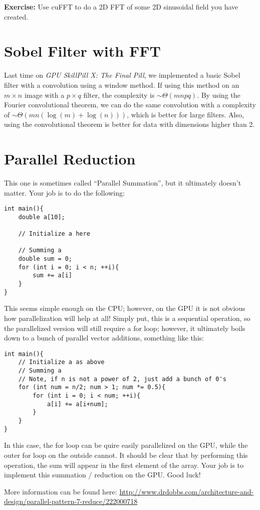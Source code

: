 \documentclass[11pt]{article}
\begin{document}
\textbf{Exercise:} Use cuFFT to do a 2D FFT of some 2D sinusoidal field you have created.

\newpage

\section*{Sobel Filter with FFT}

Last time on \textit{GPU SkillPill X: The Final Pill}, we implemented a basic Sobel filter with a convolution using a window method. If using this method on an $m \times n$ image with a $p \times q$ filter, the complexity is $\sim \Theta(mnpq)$. By using the Fourier convolutional theorem, we can do the same convolution with a complexity of $\sim \Theta(mn(\log (m) + \log (n)))$, which is better for large filters. Also, using the convolutional theorem is better for data with dimensions higher than 2.

\newpage

\section*{Parallel Reduction}

This one is sometimes called ``Parallel Summation'', but it ultimately doesn't matter. Your job is to do the following:

\begin{lstlisting}
int main(){
    double a[10];
    
    // Initialize a here
    
    // Summing a
    double sum = 0;
    for (int i = 0; i < n; ++i){
        sum += a[i]
    }
}
\end{lstlisting}

This seems simple enough on the CPU; however, on the GPU it is not obvious how parallelization will help at all! Simply put, this is a sequential operation, so the parallelized version will still require a for loop; however, it ultimately boils down to a bunch of parallel vector additions, something like this:

\begin{lstlisting}
int main(){
    // Initialize a as above
    // Summing a
    // Note, if n is not a power of 2, just add a bunch of 0's
    for (int num = n/2; num > 1; num *= 0.5){
        for (int i = 0; i < num; ++i){
            a[i] += a[i+num];
        }
    }
}
\end{lstlisting}

In this case, the for loop can be quire easily parallelized on the GPU, while the outer for loop on the outside cannot. 
It should be clear that by performing this operation, the sum will appear in the first element of the array.
Your job is to implement this summation / reduction on the GPU. Good luck!

More information can be found here: \url{http://www.drdobbs.com/architecture-and-design/parallel-pattern-7-reduce/222000718}
\end{document}
